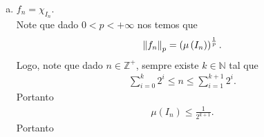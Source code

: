 \begin{homeworkProblem}[6]
\begin{solution}
\begin{enumerate}[a)]
\begin{align*}
          \lim_{n \to \infty}\norm{f_n}_p=\lim_{n \to \infty}n^{1-\frac{1}{p}}=0.
        \end{align*}
        Pelo que temos convergência em $L^{p}$.\\
        Agora, se $p=1$, temos que
        \begin{align*} 
          \lim_{n \to \infty}\norm{f_n}_1=\lim_{n \to \infty}n^{0}=1.
        \end{align*}
        Pelo que não temos convergência em $L^{1}$.\\
        Por outro lado, se $p>1$, então $1-\frac{1}{p}>0$, logo
        \begin{align*} 
          \lim_{n \to \infty}\norm{f_n}_p=\lim_{n \to \infty}n^{1-\frac{1}{p}}=+\infty.
        \end{align*}
        Pelo que não temos convergência em $L^{p}$.\\
        Por ultimo, se $p=\infty$, nos temos que
        \begin{align*}
          \lim_{n \to \infty}\norm{f_n}_\infty=\lim_{n \to \infty}n=+\infty.
        \end{align*}
        Pelo quenão temos convergência em $L^{\infty}$.
        Agora, note que dado $\alpha>0$, pegando $A=\left[0,\frac{1}{N} \right]$ con $N>\frac{1}{\alpha}$, temos que $\mu(A)<\alpha$ e que dado $\epsilon>0$ se $n\geq N$ (i.é., $\frac{1}{n}<\frac{1}{N}$) então
        \begin{align*}
          |f_n(x)|=|n\chi_{[0,\frac{1}{n}]}(x)|=0<\epsilon,\quad\text{para todo }x\in \mathbb{R}\setminus \left[ 0,\frac{1}{N} \right].
        \end{align*}
        Pelo que temos que $f_n\to f$ quase uniformemente.
      \item $f_n=\chi_{I_n}$.\\
        Note que dado $0<p<+\infty$ nos temos que
        \begin{align*}
          \left\|f_n\right\|_{p}=\left( \mu\left( I_n \right) \right)^{\frac{1}{p}}.
        \end{align*}
        Logo, note que dado $n\in\mathbb{Z}^{+}$, sempre existe $k\in\mathbb{N}$ tal que 
        \begin{align*}
          \sum_{i=0}^{k}2^{i}\leq n \leq \sum_{i=1}^{k+1}2^{i}.
        \end{align*}
        Portanto
        \begin{align*}
          \mu(I_n)\leq \frac{1}{2^{k+1}}.
        \end{align*}
        Portanto

\end{enumerate}
\end{solution}
\end{homeworkProblem}
